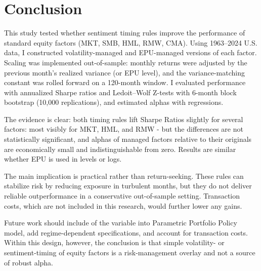 \chapter{Conclusion}
This study tested whether sentiment timing rules improve the performance of standard equity factors (MKT, SMB, HML, RMW, CMA). Using 1963–2024 U.S. data, I constructed volatility-managed and EPU-managed versions of each factor. Scaling was implemented out-of-sample: monthly returns were adjusted by the previous month’s realized variance (or EPU level), and the variance-matching constant was rolled forward on a 120-month window. I evaluated performance with annualized Sharpe ratios and Ledoit–Wolf Z-tests with 6-month block bootstrap (10,000 replications), and estimated alphas with regressions.

The evidence is clear: both timing rules lift Sharpe Ratios slightly for several factors: most visibly for MKT, HML, and RMW - but the differences are not statistically significant, and alphas of managed factors relative to their originals are economically small and indistinguishable from zero. Results are similar whether EPU is used in levels or logs.

The main implication is practical rather than return-seeking. These rules can stabilize risk by reducing exposure in turbulent months, but they do not deliver reliable outperformance in a conservative out-of-sample setting. Transaction costs, which are not included in this research, would further lower any gains.

Future work should include of the variable into Parametric Portfolio Policy model, add regime-dependent specifications, and account for transaction costs. Within this design, however, the conclusion is that simple volatility- or sentiment-timing of equity factors is a risk-management overlay and not a source of robust alpha.